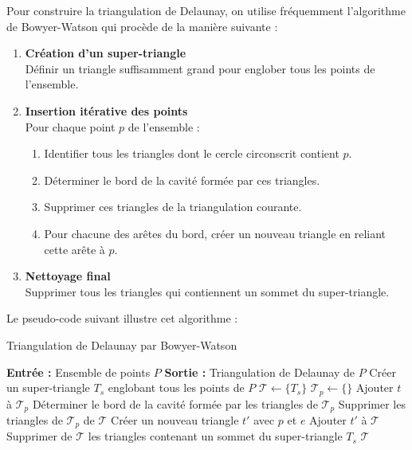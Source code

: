 \documentclass[a4paper,12pt]{article}
\theoremstyle{definition}
\begin{document}
Pour construire la triangulation de Delaunay, on utilise fréquemment l'algorithme de Bowyer-Watson qui procède de la manière suivante :

\begin{enumerate}
  \item \textbf{Création d'un super-triangle} \\
  Définir un triangle suffisamment grand pour englober tous les points de l'ensemble.

  \item \textbf{Insertion itérative des points} \\
  Pour chaque point \(p\) de l'ensemble :
  \begin{enumerate}
    \item Identifier tous les triangles dont le cercle circonscrit contient \(p\).
    \item Déterminer le bord de la cavité formée par ces triangles.
    \item Supprimer ces triangles de la triangulation courante.
    \item Pour chacune des arêtes du bord, créer un nouveau triangle en reliant cette arête à \(p\).
  \end{enumerate}

  \item \textbf{Nettoyage final} \\
  Supprimer tous les triangles qui contiennent un sommet du super-triangle.
\end{enumerate}

Le pseudo-code suivant illustre cet algorithme :

\begin{algorithm}
\caption{Triangulation de Delaunay par Bowyer-Watson}
\begin{algorithmic}[1]
\State \textbf{Entrée :} Ensemble de points \(P\)
\State \textbf{Sortie :} Triangulation de Delaunay de \(P\)
\State Créer un super-triangle \(T_s\) englobant tous les points de \(P\)
\State \(\mathcal{T} \gets \{T_s\}\)
    \State \(\mathcal{T}_p \gets \{\}\)
            \State Ajouter \(t\) à \(\mathcal{T}_p\)
        \EndIf
    \EndFor
    \State Déterminer le bord de la cavité formée par les triangles de \(\mathcal{T}_p\)
    \State Supprimer les triangles de \(\mathcal{T}_p\) de \(\mathcal{T}\)
         \State Créer un nouveau triangle \(t'\) avec \(p\) et \(e\)
         \State Ajouter \(t'\) à \(\mathcal{T}\)
    \EndFor
\EndFor
\State Supprimer de \(\mathcal{T}\) les triangles contenant un sommet du super-triangle \(T_s\)
\State \Return \(\mathcal{T}\)
\end{algorithmic}
\end{algorithm}
\end{document}
